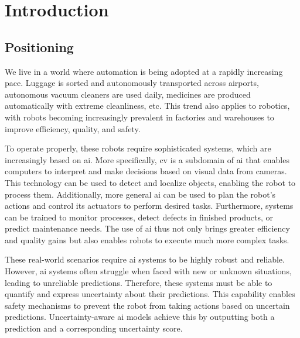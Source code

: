 

\chapter{Introduction}\label{ch:introduction}

\section{Positioning} \label{ch:introduction_section:positioning}
We live in a world where automation is being adopted at a rapidly increasing pace.
Luggage is sorted and autonomously transported across airports, autonomous vacuum cleaners are used daily, medicines are produced automatically with extreme cleanliness, etc.
This trend also applies to robotics, with robots becoming increasingly prevalent in factories and warehouses to improve efficiency, quality, and safety.

To operate properly, these robots require sophisticated systems, which are increasingly based on \gls{ai}.
More specifically, \gls{cv} is a subdomain of \gls{ai} that enables computers to interpret and make decisions based on visual data from cameras.
This technology can be used to detect and localize objects, enabling the robot to process them.
Additionally, more general \gls{ai} can be used to plan the robot's actions and control its actuators to perform desired tasks.
Furthermore, systems can be trained to monitor processes, detect defects in finished products, or predict maintenance needs.
The use of \gls{ai} thus not only brings greater efficiency and quality gains but also enables robots to execute much more complex tasks.

These real-world scenarios require \gls{ai} systems to be highly robust and reliable.
However, \gls{ai} systems often struggle when faced with new or unknown situations, leading to unreliable predictions.
Therefore, these systems must be able to quantify and express uncertainty about their predictions.
This capability enables safety mechanisms to prevent the robot from taking actions based on uncertain predictions.
Uncertainty-aware \gls{ai} models achieve this by outputting both a prediction and a corresponding uncertainty score.

